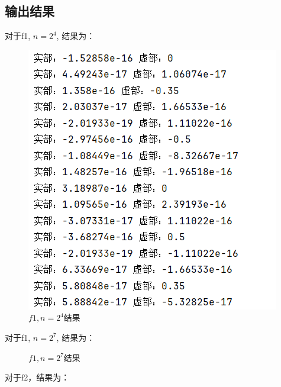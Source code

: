 \documentclass[12pt,a4paper,oneside]{article}
\begin{document}
\subsection{输出结果}
对于f1, $n=2^4$, 结果为：
\begin{figure}[H]
    \centering
    \includegraphics[scale = 0.5]{figs/f1_1.png}
    \caption{$f1,n=2^4$结果}
\end{figure}
对于f1, $n=2^7$, 结果为：
\begin{figure}[H]
    \centering
    \caption{$f1,n=2^7$结果}
\end{figure}
对于f2，结果为：
\end{document}
